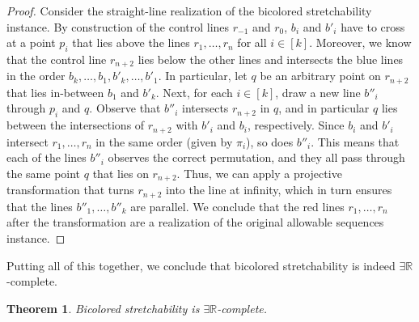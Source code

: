 \documentclass[11pt]{article}
\newtheorem{theorem}{Theorem}
\newcommand{\ER}{\exists\mathbb{R}}
\newcommand{\AS}{allowable sequences\xspace}
\begin{document}
\begin{proof}
    Consider the straight-line realization of the bicolored stretchability instance. By construction of the control lines $r_{-1}$ and $r_0$, $b_i$ and $b'_i$ have to cross at a point $p_i$ that lies above the lines $r_1, \dots, r_n$ for all $i \in [k]$. Moreover, we know that the control line $r_{n + 2}$ lies below the other lines and intersects the blue lines in the order $b_k, \dots, b_1, b'_k, \dots, b'_1$. In particular, let $q$ be an arbitrary point on $r_{n + 2}$ that lies in-between $b_1$ and $b'_k$. 
%
    Next, for each $i \in [k]$, draw a new line $b''_i$ through $p_i$ and $q$. Observe that $b''_i$ intersects $r_{n + 2}$ in $q$, and in particular $q$ lies between the intersections of $r_{n + 2}$ with $b'_i$ and $b_i$, respectively. Since $b_i$ and $b'_i$ intersect $r_1, \dots, r_n$ in the same order (given by $\pi_i$), so does $b''_i$. This means that each of the lines $b''_i$ observes the correct permutation, and they all pass through the same point $q$ that lies on $r_{n + 2}$. Thus, we can apply a projective transformation that turns $r_{n + 2}$ into the line at infinity, which in turn ensures that the lines $b''_1, \dots, b''_k$ are parallel. We conclude that the red lines $r_1, \dots, r_n$ after the transformation are a realization of the original \AS instance.   
\end{proof}
%
Putting all of this together, we conclude that bicolored stretchability is indeed $\ER$-complete. 
%

\begin{theorem}
\label{theorem:er-hardness}
    Bicolored stretchability is $\ER$-complete.
\end{theorem}
\end{document}
